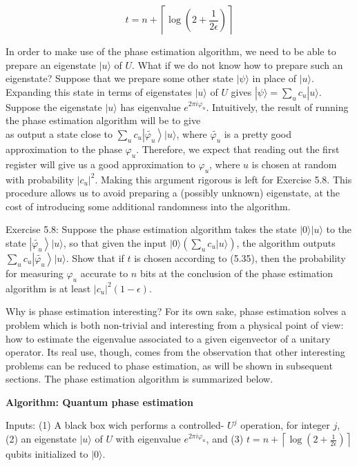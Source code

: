 \begin{equation}
    t=n+\left\lceil\log \left(2+\frac{1}{2 \epsilon}\right)\right\rceil \tag{5.35}
\end{equation}

In order to make use of the phase estimation algorithm, we need to be able to prepare an eigenstate $|u\rangle$ of $U$. What if we do not know how to prepare such an eigenstate? Suppose that we prepare some other state $|\psi\rangle$ in place of $|u\rangle$. Expanding this state in terms of eigenstates $|u\rangle$ of $U$ gives $|\psi\rangle=\sum_{u} c_{u}|u\rangle$. Suppose the eigenstate $|u\rangle$ has eigenvalue $e^{2 \pi i \varphi_{u}}$. Intuitively, the result of running the phase estimation algorithm will be to give\\
as output a state close to $\sum_{u} c_{u}\left|\widetilde{\varphi_{u}}\right\rangle|u\rangle$, where $\widetilde{\varphi_{u}}$ is a pretty good approximation to the phase $\varphi_{u}$. Therefore, we expect that reading out the first register will give us a good approximation to $\varphi_{u}$, where $u$ is chosen at random with probability $\left|c_{u}\right|^{2}$. Making this argument rigorous is left for Exercise 5.8. This procedure allows us to avoid preparing a (possibly unknown) eigenstate, at the cost of introducing some additional randomness into the algorithm.

Exercise 5.8: Suppose the phase estimation algorithm takes the state $|0\rangle|u\rangle$ to the state $\left|\widetilde{\varphi_{u}}\right\rangle|u\rangle$, so that given the input $|0\rangle\left(\sum_{u} c_{u}|u\rangle\right)$, the algorithm outputs $\sum_{u} c_{u}\left|\widetilde{\varphi_{u}}\right\rangle|u\rangle$. Show that if $t$ is chosen according to (5.35), then the probability for measuring $\varphi_{u}$ accurate to $n$ bits at the conclusion of the phase estimation algorithm is at least $\left|c_{u}\right|^{2}(1-\epsilon)$.

Why is phase estimation interesting? For its own sake, phase estimation solves a problem which is both non-trivial and interesting from a physical point of view: how to estimate the eigenvalue associated to a given eigenvector of a unitary operator. Its real use, though, comes from the observation that other interesting problems can be reduced to phase estimation, as will be shown in subsequent sections. The phase estimation algorithm is summarized below.

\textbf{Algorithm: Quantum phase estimation}

Inputs: (1) A black box wich performs a controlled- $U^{j}$ operation, for integer $j$, (2) an eigenstate $|u\rangle$ of $U$ with eigenvalue $e^{2 \pi i \varphi_{u}}$, and (3) $t=n+\left\lceil\log \left(2+\frac{1}{2 \epsilon}\right)\right\rceil$ qubits initialized to $|0\rangle$.

